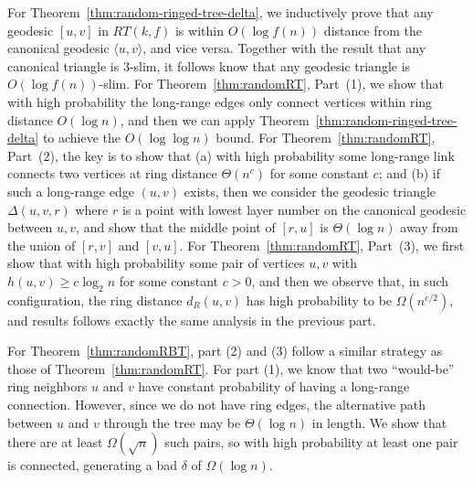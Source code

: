 \documentclass[11pt]{article}
\begin{document}
For Theorem~\ref{thm:random-ringed-tree-delta}, we inductively prove that
	any geodesic $[u,v]$ in $RT(k,f)$ is within $O(\log f(n))$ distance
	from the canonical geodesic $\langle u,v\rangle$, and vice versa.
Together with the result that any canonical triangle is $3$-slim, it follows
	know that any geodesic triangle is $O(\log f(n))$-slim.
%
For Theorem~\ref{thm:randomRT}, Part~(1), we show that with high probability
	the long-range edges only connect vertices within ring distance
	$O(\log n)$, and then we can apply 
	Theorem~\ref{thm:random-ringed-tree-delta} to achieve the
	$O(\log\log n)$ bound.
For Theorem~\ref{thm:randomRT}, Part~(2), the key is to show that 
	(a) with high probability some long-range link connects two vertices
	at ring distance $\Theta(n^c)$ for some constant $c$; and 
	(b) if such a long-range edge $(u,v)$ exists, then we consider the
	geodesic triangle $\Delta(u,v,r)$ where $r$ is a point with lowest layer number on the canonical geodesic between $u,v$, and show that
	the middle point of $[r,u]$ is $\Theta(\log n)$ away from the union
	of $[r,v]$ and $[v,u]$.
For Theorem~\ref{thm:randomRT}, Part~(3), we first show that with high probability some pair of vertices $u,v$ with $h(u,v)\geq c \log_2 n$ for some constant $c>0$, and then we observe that, in such configuration, the ring distance $d_R(u,v)$ has high probability to be $\Omega(n^{c/2})$, and results follows exactly the same analysis in the previous part.

For Theorem~\ref{thm:randomRBT}, part (2) and (3) follow a similar
	strategy as those of Theorem~\ref{thm:randomRT}. 
For part (1), we know that two ``would-be'' ring neighbors $u$ and $v$
	have constant probability of having a long-range connection.
However, since we do not have ring edges, the alternative path between $u$
	and $v$ through the tree may be $\Theta(\log n)$ in length.
We show that there are at least $\Omega(\sqrt{n})$ such pairs, so with
	high probability at least
	one pair is connected, generating a bad $\delta$ of $\Omega(\log n)$.

\end{document}
